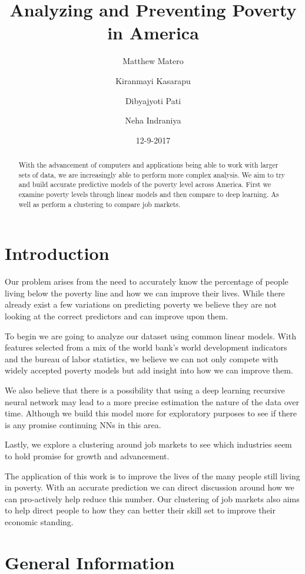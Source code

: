 \documentclass[11pt,letterpaper]{article}
\title{Analyzing and Preventing Poverty in America}
\author{Matthew Matero \and Kiranmayi Kasarapu \and Dibyajyoti Pati \and Neha  Indraniya}
\date{12-9-2017}
\begin{document}
\maketitle

\begin{abstract}
 With the advancement of computers and applications being able to work with larger sets of data, we are increasingly able to perform more complex analysis. We aim to try and build accurate predictive models of the poverty level across America. First we examine poverty levels through linear models and then compare to deep learning. As well as perform a clustering to compare job markets. 
\end{abstract}

\section{Introduction}

Our problem arises from the need to accurately know the percentage of people living below the poverty line and how we can improve their lives. While there already exist a few variations on predicting poverty we believe they are not looking at the correct predictors and can improve upon them.

To begin we are going to analyze our dataset using common linear models. With features selected from a mix of the world bank's world development indicators and the bureau of labor statistics, we believe we can not only compete with widely accepted poverty models but add insight into how we can improve them.

We also believe that there is a possibility that using a deep learning recursive neural network may lead to a more precise estimation the nature of the data over time. Although we build this model more for exploratory purposes to see if there is any promise continuing NNs in this area.

Lastly, we explore a clustering around job markets to see which industries seem to hold promise for growth and advancement. 
 
The application of this work is to improve the lives of the many people still living in poverty. With an accurate prediction we can direct discussion around how we can pro-actively help reduce this number. Our clustering of job markets also aims to help direct people to how they can better their skill set to improve their economic standing. 

\section{General Information}
\end{document}
